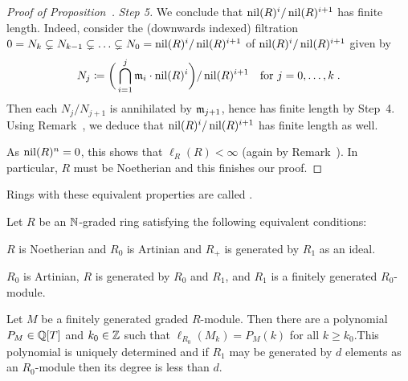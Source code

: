 \documentclass[a4paper,parskip=half,numbers=enddot, DIV=12]{scrreprt}
\begin{document}
\begin{proof}[Proof of Proposition~]
    \emph{Step 5.} We conclude that $\operatorname{nil}(R)^i/\operatorname{nil}(R)^{i+1}$ has finite length. Indeed, consider the (downwards indexed) filtration $0=N_k\subsetneq N_{k-1}\subsetneq \ldots\subsetneq N_0=\operatorname{nil}(R)^i/\operatorname{nil}(R)^{i+1}$ of $\operatorname{nil}(R)^i/\operatorname{nil}(R)^{i+1}$ given by
    \begin{align*}
        N_j\coloneqq\bigg(\bigcap_{i=1}^j\mathfrak{m}_i\cdot\operatorname{nil}(R)^i\bigg) /\operatorname{nil}(R)^{i+1}\quad\text{for }j=0,\ldots,k\;.
    \end{align*}
    Then each $N_j/N_{j+1}$  is annihilated by $\mathfrak{m}_{j+1}$, hence has finite length by Step~4.  Using Remark~, we deduce that $\operatorname{nil}(R)^i/\operatorname{nil}(R)^{i+1}$ has finite length as well.
    
    As $\operatorname{nil}(R)^n=0$, this shows that $\ell_R(R) <\infty$ (again by Remark~). In particular, $R$ must be Noetherian and this finishes our proof.
\end{proof}

\begin{defi}[Artinian]
    Rings with these equivalent properties are called .
\end{defi}
\begin{thm}
    Let $R$ be an $\mathbb{N}$-graded ring satisfying the following equivalent conditions:
    \begin{alphanumerate}
    \item 
        $R$ is Noetherian and $R_0$ is Artinian and $R_+$ is generated by $R_1$ as an ideal.
    \item 
        $R_0$ is Artinian, $R$ is generated by $R_0$ and $R_1$, and $R_1$ is a finitely generated $R_0$-module.
    \end{alphanumerate}
    Let $M$ be a finitely generated graded $R$-module. Then there are a polynomial $P_M\in \mathbb{Q}[T]$ and $k_0\in\mathbb{Z}$ such that $\ell_{R_0}(M_k) = P_M(k)$ for all $k\geq k_0$.This polynomial is uniquely determined and if $R_1$ may be generated by $d$ elements as an $R_0$-module then its degree is less than $d$.
\end{thm}
\end{document}
